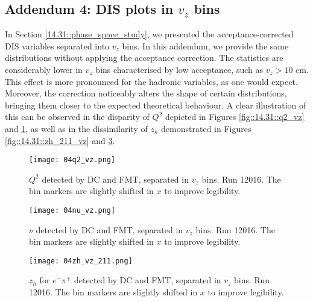 \subsection*{Addendum 4: DIS plots in $v_z$ bins}
\label{20.04::dis_vz_plots}
    In Section \ref{14.31::phase_space_study}, we presented the acceptance-corrected DIS variables separated into $v_z$ bins.
    In this addendum, we provide the same distributions without applying the acceptance correction.
    The statistics are considerably lower in $v_z$ bins characterised by low acceptance, such as $v_z > 10$ cm.
    This effect is more pronounced for the hadronic variables, as one would expect.
    Moreover, the correction noticeably alters the shape of certain distributions, bringing them closer to the expected theoretical behaviour.
    A clear illustration of this can be observed in the disparity of $Q^2$ depicted in Figures \ref{fig::14.31::q2_vz} and \ref{fig::20.04::q2_vz}, as well as in the dissimilarity of $z_h$ demonstrated in Figures \ref{fig::14.31::zh_211_vz} and \ref{fig::20.04::zh_211_vz}.


    \begin{figure}
        \centering
        \texttt{[image: 04q2\_vz.png]}
        \caption[$Q^2$ separated in $v_z$ bins]
        {$Q^2$ detected by DC and FMT, separated in $v_z$ bins.
        Run 12016.
        The bin markers are slightly shifted in $x$ to improve legibility.}
        \label{fig::20.04::q2_vz}
    \end{figure}

    \begin{figure}
        \centering
        \texttt{[image: 04nu\_vz.png]}
        \caption[$\nu$ separated in $v_z$ bins]
        {$\nu$ detected by DC and FMT, separated in $v_z$ bins.
        Run 12016.
        The bin markers are slightly shifted in $x$ to improve legibility.}
        \label{fig::20.04::nu_vz}
    \end{figure}

    \begin{figure}
        \centering
        \texttt{[image: 04zh\_vz\_211.png]}
        \caption[$z_h$ for $e^-\pi^+$ separated in $v_z$ bins]
        {$z_h$ for $e^-\pi^+$ detected by DC and FMT, separated in $v_z$ bins.
        Run 12016.
        The bin markers are slightly shifted in $x$ to improve legibility.}
        \label{fig::20.04::zh_211_vz}
    \end{figure}

